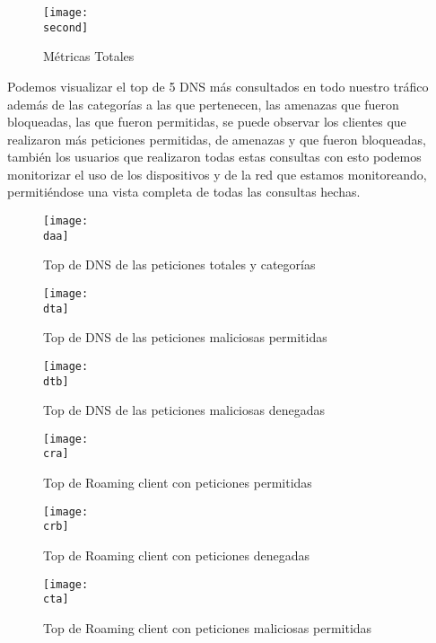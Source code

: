 \documentclass[a4paper]{article}
\newcommand{\second}{img/metricaTotal.png}
\newcommand{\cra}{img/client-request-allow.png}
\newcommand{\crb}{img/client-request-block.png}
\newcommand{\cta}{img/client-threat-allow.png}
\newcommand{\daa}{img/domain-all-all.png}
\newcommand{\dta}{img/domain-threat-allow.png}
\newcommand{\dtb}{img/domain-threat-block.png}
\begin{document}
    \begin{figure}[H] 
        \centering 
        \texttt{[image: \\second]} 
        \caption{Métricas Totales} 
    \end{figure} 

    Podemos visualizar el top de 5 DNS más consultados en todo nuestro tráfico además de las categorías a las que pertenecen, las amenazas que fueron bloqueadas, las que fueron permitidas, se puede observar los clientes que realizaron más peticiones permitidas, de amenazas y que fueron bloqueadas, también los usuarios que realizaron todas estas consultas con esto podemos monitorizar el uso de los dispositivos y de la red que estamos monitoreando, permitiéndose una vista completa de todas las consultas hechas.

    \begin{figure}[H] 
        \centering 
        \texttt{[image: \\daa]} 
        \caption{Top de DNS de las peticiones totales y categorías} 
    \end{figure}

    \begin{figure}[H]
        \centering
        \texttt{[image: \\dta]}
        \caption{Top de DNS de las peticiones maliciosas permitidas}
    \end{figure}

    \begin{figure}[H]
        \centering
        \texttt{[image: \\dtb]}
        \caption{Top de DNS de las peticiones maliciosas denegadas}
    \end{figure}

    \begin{figure}[H]
        \centering
        \texttt{[image: \\cra]}
        \caption{Top de Roaming client con peticiones permitidas}
    \end{figure}

    \begin{figure}[H]
        \centering
        \texttt{[image: \\crb]}
        \caption{Top de Roaming client con peticiones denegadas}
    \end{figure}

    \begin{figure}[H]
        \centering
        \texttt{[image: \\cta]}
        \caption{Top de Roaming client con peticiones maliciosas permitidas}
    \end{figure}
\end{document}
